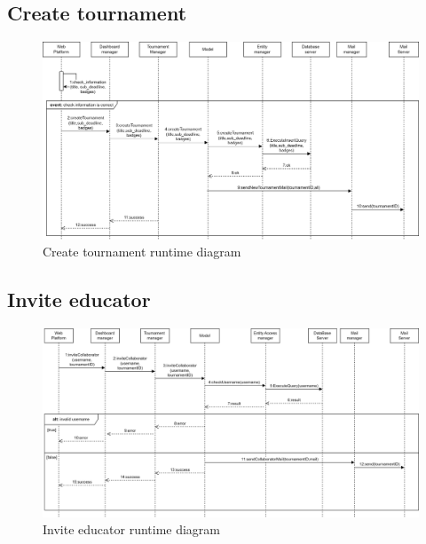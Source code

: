 \subsection*{Create tournament}
\begin{figure}[h]
    \centering
    \includegraphics[width=\textwidth]{images/runtime/createT.png}
    \caption{Create tournament runtime diagram}
    \label{fig:rt-createT}
\end{figure}
\clearpage

\subsection*{Invite educator}
\begin{figure}[h]
    \centering
    \includegraphics[width=\textwidth]{images/runtime/inviteE.png}
    \caption{Invite educator runtime diagram}
    \label{fig:rt-inviteE}
\end{figure}

